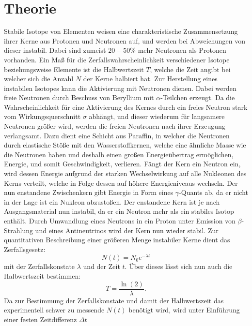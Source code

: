 \section{Theorie}
\label{sec:Theorie}
Stabile Isotope von Elementen weisen eine charakteristische Zusammensetzung ihrer Kerne aus Protonen und Neutronen auf, und werden bei Abweichungen von dieser instabil.
Dabei sind zumeist $20-50 \si{\percent}$ mehr Neutronen als Protonen vorhanden. Ein Maß für die Zerfallswahrscheinlichkeit verschiedener Isotope beziehungsweise Elemente ist
die Halbwertszeit $T$, welche die Zeit angibt bei welcher sich die Anzahl $N$ der Kerne halbiert hat. Zur Herstellung eines instabilen Isotopes kann die Aktivierung mit Neutronen
dienen. Dabei werden freie Neutronen durch Beschuss von Beryllium mit $\alpha$-Teilchen erzeugt. Da die Wahrscheinlichkeit für eine Aktivierung des Kernes durch ein freies Neutron
stark vom Wirkungsquerschnitt $\sigma$ abhängt, und dieser wiederum für langsamere Neutronen größer wird, werden die freien Neutronen nach ihrer Erzeugung verlangsamt.
Dazu dient eine Schicht aus Paraffin, in welcher die Neutronen durch elastische Stöße mit den Wasserstoffkernen, welche eine ähnliche Masse wie die Neutronen haben und deshalb
einen großen Energieübertrag ermöglichen, Energie, und somit Geschwindigkeit, verlieren.
Fängt der Kern ein Neutron ein, wird dessen Energie aufgrund der starken Wechselwirkung auf alle Nukleonen des Kerns verteilt, welche in Folge dessen auf höhere Energieniveaus wechseln.
Der nun enstandene Zwischenkern gibt Energie in Form eines $\gamma$-Quants ab, da er nicht in der Lage ist ein Nukleon abzustoßen. Der enstandene Kern ist je nach
Ausgangsmaterial nun instabil, da er ein Neutron mehr als ein stabiles Isotop enthält. Durch Umwandlung eines Neutrons in ein Proton unter Emission von $\beta$-Strahlung und eines Antineutrinos wird der
Kern nun wieder stabil. Zur quantitativen Beschreibung einer größeren Menge instabiler Kerne dient das Zerfallsgesetz:
\begin{equation}
  N(t)= N_0 e^{- \lambda t}
  \label{eqn:Zerfallsgesetz}
\end{equation}
mit der Zerfallskonstate $\lambda$ und der Zeit $t$. Über dieses lässt sich nun auch die Halbwertszeit bestimmen:
\begin{equation}
  T=\frac{\ln(2)}{\lambda}.
  \label{eqn:Halbwertszeit}
\end{equation}
Da zur Bestimmung der Zerfallskonstate und damit der Halbwertszeit das experimentell schwer zu messende $N(t)$ benötigt wird, wird unter Einführung einer festen Zeitdifferenz $\Delta t$
